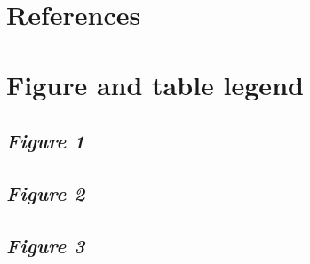 \documentclass[12pt,]{article}
\begin{document}
\newpage

\hypertarget{references}{%
\section{References}\label{references}}

\setlength{\parindent}{-0.0in}
\setlength{\leftskip}{0.0in}
\setlength{\parskip}{8pt}
\vspace*{-0.0in}

\noindent

\newlength{\cslhangindent}
\newenvironment{CSLReferences}%
{\setlength{\parindent}{0pt}%
\everypar{\setlength{\hangindent}{\cslhangindent}}\ignorespaces}%
{\par}

\hypertarget{refs}{}
\begin{CSLReferences}{0}{0}
\end{CSLReferences}

\newpage

\hypertarget{figure-and-table-legend}{%
\section{Figure and table legend}\label{figure-and-table-legend}}

\setlength{\parindent}{-0.2in}
\setlength{\leftskip}{0.2in}
\setlength{\parskip}{8pt}
\vspace*{-0.2in}

\noindent

\newpage

\hypertarget{figure-1}{%
\subsection{\texorpdfstring{\emph{Figure 1}}{Figure 1}}\label{figure-1}}

\newpage

\hypertarget{figure-2}{%
\subsection{\texorpdfstring{\emph{Figure 2}}{Figure 2}}\label{figure-2}}

\newpage

\hypertarget{figure-3}{%
\subsection{\texorpdfstring{\emph{Figure 3}}{Figure 3}}\label{figure-3}}
\end{document}

